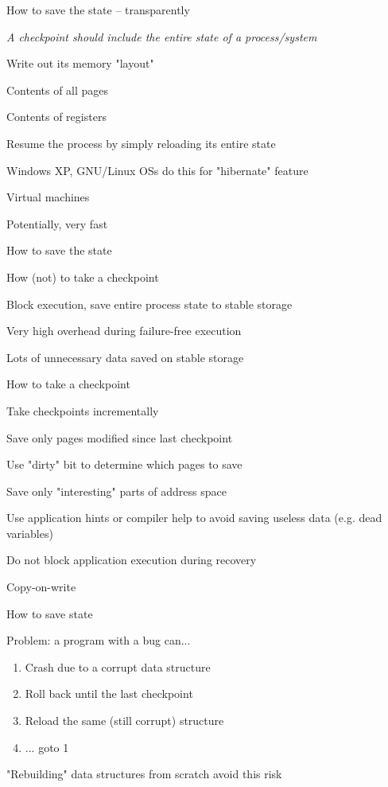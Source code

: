 \begin{frame}{How to save the state -- transparently}
\BIL
	\item  \emph{A checkpoint should include the entire state of a process/system}
		\BI
		\item Write out its memory "layout"
		\item Contents of all pages
		\item Contents of registers
		\EI
	\item Resume the process by simply reloading its entire state
		\BI
		\item Windows XP, GNU/Linux OSs do this for "hibernate" feature
		\item Virtual machines
		\EI
	\item Potentially, very fast
\EIL
\end{frame}

\begin{frame}{How to save the state}
\BIL
	\item How (not) to take a checkpoint
		\BI
		\item Block execution, save entire process state to stable storage
		\item Very high overhead during failure-free execution
		\item Lots of unnecessary data saved on stable storage
		\EI
	\item How to take a checkpoint
	\BI
		\item Take checkpoints incrementally
			\BI
			\item Save only pages modified since last checkpoint
			\item Use "dirty" bit to determine which pages to save
			\EI
		\item Save only "interesting" parts of address space
			\BI
			\item Use application hints or compiler help to avoid saving useless data (e.g. dead variables)
			\EI
		\item Do not block application execution during recovery
			\BI
			\item Copy-on-write	
			\EI
	\EI
\EIL	
\end{frame}

\begin{frame}{How to save state}
\BIL
\item Problem: a program with a bug can...
\begin{enumerate}
\item Crash due to a corrupt data structure
\item Roll back until the last checkpoint
\item Reload the same (still corrupt) structure
\item ... goto 1
\end{enumerate}
\item "Rebuilding" data structures from scratch avoid this risk
\EIL
\end{frame}

